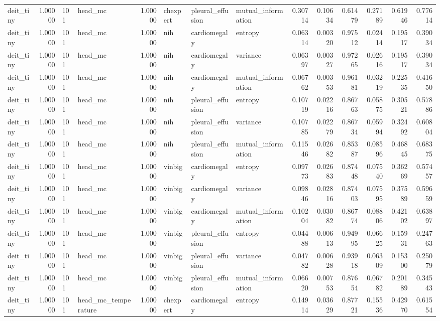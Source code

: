 \begin{tabular}{lrllrlllrrrrrr}
deit\_tiny & 1.00000 & 101 & head\_mc & 1.00000 & chexpert & pleural\_effusion & mutual\_information & 0.30714 & 0.10634 & 0.61479 & 0.27189 & 0.61946 & 0.77614 \\
deit\_tiny & 1.00000 & 101 & head\_mc & 1.00000 & nih & cardiomegaly & entropy & 0.06314 & 0.00320 & 0.97512 & 0.02414 & 0.19517 & 0.39034 \\
deit\_tiny & 1.00000 & 101 & head\_mc & 1.00000 & nih & cardiomegaly & variance & 0.06397 & 0.00327 & 0.97265 & 0.02616 & 0.19517 & 0.39034 \\
deit\_tiny & 1.00000 & 101 & head\_mc & 1.00000 & nih & cardiomegaly & mutual\_information & 0.06762 & 0.00353 & 0.96181 & 0.03219 & 0.22535 & 0.41650 \\
deit\_tiny & 1.00000 & 101 & head\_mc & 1.00000 & nih & pleural\_effusion & entropy & 0.10719 & 0.02216 & 0.86763 & 0.05875 & 0.30521 & 0.57886 \\
deit\_tiny & 1.00000 & 101 & head\_mc & 1.00000 & nih & pleural\_effusion & variance & 0.10785 & 0.02279 & 0.86734 & 0.05994 & 0.32492 & 0.60804 \\
deit\_tiny & 1.00000 & 101 & head\_mc & 1.00000 & nih & pleural\_effusion & mutual\_information & 0.11546 & 0.02682 & 0.85387 & 0.08596 & 0.46845 & 0.68375 \\
deit\_tiny & 1.00000 & 101 & head\_mc & 1.00000 & vinbig & cardiomegaly & entropy & 0.09773 & 0.02683 & 0.87448 & 0.07540 & 0.36269 & 0.57457 \\
deit\_tiny & 1.00000 & 101 & head\_mc & 1.00000 & vinbig & cardiomegaly & variance & 0.09846 & 0.02816 & 0.87403 & 0.07595 & 0.37589 & 0.59659 \\
deit\_tiny & 1.00000 & 101 & head\_mc & 1.00000 & vinbig & cardiomegaly & mutual\_information & 0.10204 & 0.03082 & 0.86774 & 0.08806 & 0.42102 & 0.63897 \\
deit\_tiny & 1.00000 & 101 & head\_mc & 1.00000 & vinbig & pleural\_effusion & entropy & 0.04488 & 0.00613 & 0.94995 & 0.06625 & 0.15931 & 0.24763 \\
deit\_tiny & 1.00000 & 101 & head\_mc & 1.00000 & vinbig & pleural\_effusion & variance & 0.04782 & 0.00628 & 0.93918 & 0.06309 & 0.15300 & 0.25079 \\
deit\_tiny & 1.00000 & 101 & head\_mc & 1.00000 & vinbig & pleural\_effusion & mutual\_information & 0.06620 & 0.00753 & 0.87654 & 0.06782 & 0.20189 & 0.34543 \\
deit\_tiny & 1.00000 & 101 & head\_mc\_temperature & 1.00000 & chexpert & cardiomegaly & entropy & 0.14914 & 0.03629 & 0.87721 & 0.15536 & 0.42970 & 0.61554 \\

\end{tabular}
